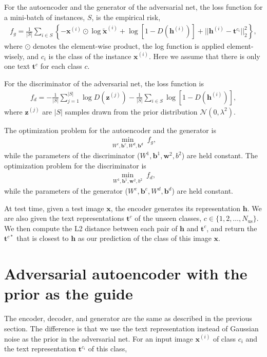 \documentclass{article}
\newcommand{\bb}[1]{\boldsymbol{#1}}
\begin{document}
	For the autoencoder and the generator of the adversarial net, the loss function for a mini-batch of instances, $S$, is the empirical risk,
	\begin{align}
		f_g = \frac{1}{|S|} \sum_{i \in S} \left\{ -\bb{x}^{(i)} \odot \log \tilde{\bb{x}}^{(i)} + \log\left[ 1 - D( \bb{h}^{(i)} ) \right] + || \bb{h}^{(i)} - \bb{t}^{c_i} ||_2^2 \right\},
	\end{align}
	where $\odot$ denotes the element-wise product, the log function is applied element-wisely, and $c_i$ is the class of the instance $\bb{x}^{(i)}$. Here we assume that there is only one text $\bb{t}^c$ for each class $c$.

	For the discriminator of the adversarial net, the loss function is
	\begin{align}
		f_d = -\frac{1}{|S|} \sum_{j = 1}^{|S|} \log D( \bb{z}^{(j)} ) - \frac{1}{|S|} \sum_{i \in S} \log\left[ 1 - D( \bb{h}^{(i)} ) \right],
	\end{align}
	where $\bb{z}^{(j)}$ are $|S|$ samples drawn from the prior distribution $\mathcal{N}(0, \lambda^2)$.
	
	The optimization problem for the autoencoder and the generator is
	\begin{align}
		\min_{W^e, \bb{b}^e, W^d, \bb{b}^d} \; f_g,
	\end{align}
	while the parameters of the discriminator ($W^1, \bb{b}^1, \bb{w}^2, b^2$) are held constant. The optimization problem for the discriminator is
	\begin{align}
		\min_{W^1, \bb{b}^1, \bb{w}^2, b^2} \; f_d,
	\end{align}
	while the parameters of the generator ($W^e, \bb{b}^e, W^d, \bb{b}^d$) are held constant.

	At test time, given a test image $\bb{x}$, the encoder generates its representation $\bb{h}$. We are also given the text representations $\bb{t}^c$ of the unseen classes, $c \in \{ 1, 2, \dots, N_{\textrm{us}} \}$. We then compute the L2 distance between each pair of $\bb{h}$ and $\bb{t}^c$, and return the $\bb{t}^{c*}$ that is closest to $\bb{h}$ as our prediction of the class of this image $\bb{x}$.




\section{Adversarial autoencoder with the prior as the guide}

	The encoder, decoder, and generator are the same as described in the previous section. The difference is that we use the text representation instead of Gaussian noise as the prior in the adversarial net. For an input image $\bb{x}^{(i)}$ of class $c_i$ and the text representation $\bb{t}^{c_i}$ of this class,




%
%
\end{document}
